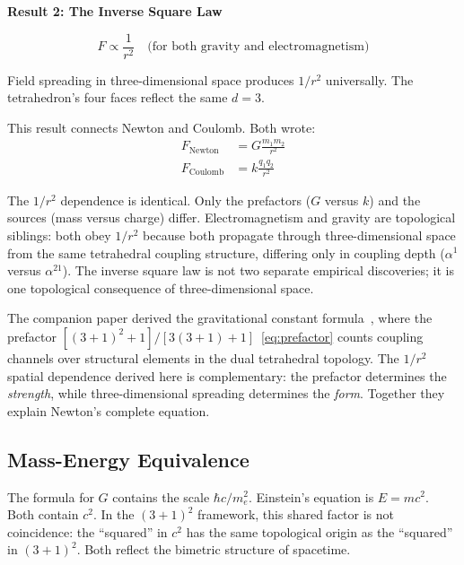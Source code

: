 \documentclass[aps,prd,preprint,superscriptaddress,showpacs,preprintnumbers,amsmath,amssymb,nofootinbib]{revtex4-2}
\begin{document}
\vspace{1.5em}
\noindent
\colorbox{resultgreen}{\parbox{\dimexpr\textwidth-2\fboxsep\relax}{%
\vspace{0.8em}
\centering
\textbf{\large Result 2: The Inverse Square Law}

\vspace{0.5em}
\boldmath
\begin{equation}
F \propto \frac{1}{r^2} \quad \text{(for both gravity and electromagnetism)}
\end{equation}
\unboldmath

\vspace{0.3em}
Field spreading in three-dimensional space produces $1/r^2$ universally. The tetrahedron's four faces reflect the same $d = 3$.
\vspace{0.5em}
}}
\vspace{1cm}

This result connects Newton and Coulomb. Both wrote:
\begin{align}
F_{\text{Newton}} &= G\frac{m_1 m_2}{r^2} \\[0.5em]
F_{\text{Coulomb}} &= k\frac{q_1 q_2}{r^2}
\end{align}

The $1/r^2$ dependence is identical. Only the prefactors ($G$ versus $k$) and the sources (mass versus charge) differ. Electromagnetism and gravity are topological siblings: both obey $1/r^2$ because both propagate through three-dimensional space from the same tetrahedral coupling structure, differing only in coupling depth ($\alpha^1$ versus $\alpha^{21}$). The inverse square law is not two separate empirical discoveries; it is one topological consequence of three-dimensional space.

The companion paper derived the gravitational constant formula~\cite{paper6}, where the prefactor $[(3+1)^2+1]/[3(3+1)+1]$~\eqref{eq:prefactor} counts coupling channels over structural elements in the dual tetrahedral topology. The $1/r^2$ spatial dependence derived here is complementary: the prefactor determines the \emph{strength}, while three-dimensional spreading determines the \emph{form}. Together they explain Newton's complete equation.

\subsection{Mass-Energy Equivalence}
\label{subsec:emc2}

The formula for $G$ contains the scale $\hbar c / m_e^2$. Einstein's equation is $E = mc^2$. Both contain $c^2$. In the $(3+1)^2$ framework, this shared factor is not coincidence: the ``squared'' in $c^2$ has the same topological origin as the ``squared'' in $(3+1)^2$. Both reflect the bimetric structure of spacetime.
\end{document}
